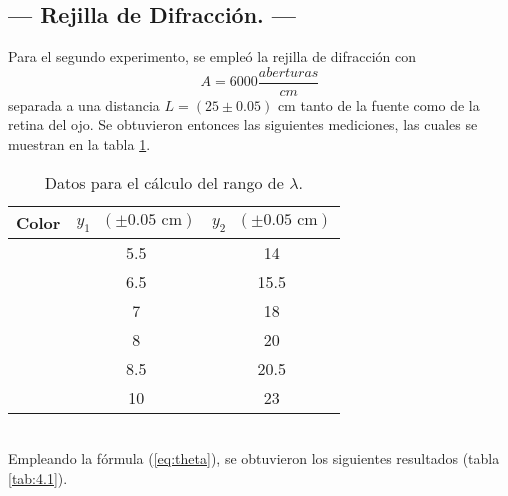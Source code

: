 \documentclass[12pt,a4paper]{article}
\begin{document}
\subsection{--- Rejilla de Difracción. ---} %
\label{sub:resul_reijlla_de_difraccion}
Para el segundo experimento, se empleó la rejilla de difracción con 
$$ A=6000\dfrac{aberturas}{cm} $$
separada a una distancia $ L=(25\pm0.05)\mbox{ cm} $ tanto de la fuente como de la retina del ojo.
Se obtuvieron entonces las siguientes mediciones, las cuales se muestran en la tabla \ref{tab:3}.
\begin{table}[!htb]
\centering
\caption{Datos para el cálculo del rango de $ \lambda $.}
\begin{tabular}{|c|c|c|}
	\hline
	Color & $ y_1\mbox{ }(\pm0.05\mbox{ cm})$ & $ y_2\mbox{ }(\pm0.05\mbox{ cm})$ \\ \hline
	\rowcolor{violet!25}
	\cellcolor{violet!40}{Violeta}  & 5.5 & 14   \\ \hline
	\rowcolor{blue!25}
	\cellcolor{blue!40}{Azul}     & 6.5 & 15.5 \\ \hline
	\rowcolor{green!25}
	\cellcolor{green!40}{Verde}    & 7   & 18   \\ \hline
	\rowcolor{yellow!25}
	\cellcolor{yellow!40}{Amarillo} & 8   & 20   \\ \hline
	\rowcolor{orange!25}
	\cellcolor{orange!40}{Anaranjado} & 8.5 & 20.5 \\ \hline
	\rowcolor{red!25}
	\cellcolor{red!40}{Rojo}     & 10  & 23   \\ \hline
\end{tabular}
\label{tab:3}
\end{table}\\
Empleando la fórmula (\ref{eq:theta}), se obtuvieron los siguientes resultados (tabla \ref{tab:4.1}).
\end{document}
